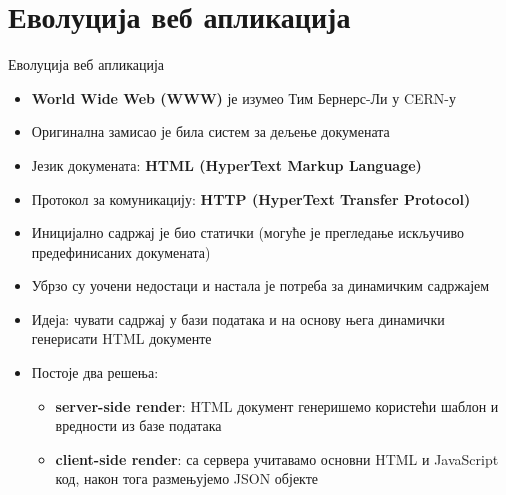 \documentclass{beamer}
\begin{document}
    \section{Еволуција веб апликација}
    
    \begin{frame}[allowframebreaks]{Еволуција веб апликација}
        \begin{itemize}
            \item \textbf{World Wide Web (WWW)} је изумео Тим Бернерс-Ли у CERN-у
            \item Оригинална замисао је била систем за дељење докумената
            \item Језик докумената: \textbf{HTML (HyperText Markup Language)}
            \item Протокол за комуникацију: \textbf{HTTP (HyperText Transfer Protocol)}
            \item Иницијално садржај је био статички (могуће је прегледање искључиво предефинисаних докумената)
            \item Убрзо су уочени недостаци и настала је потреба за динамичким садржајем
        \end{itemize}
        
        \framebreak
        
        \begin{itemize}
            \item Идеја: чувати садржај у бази података и на основу њега динамички генерисати HTML документе
            \item Постоје два решења:
            \begin{itemize}
                \item \textbf{server-side render}: HTML документ генеришемо користећи шаблон и вредности из базе података
                \item \textbf{client-side render}: са сервера учитавамо основни HTML и JavaScript код, након тога размењујемо JSON објекте
            \end{itemize}
        \end{itemize}
        
        \framebreak
        

\end{frame}
\end{document}
